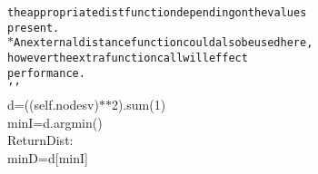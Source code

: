 {{\begin{tabbing}
{\texttt{\hspace{84pt}the\hspace{6pt}appropriate\hspace{6pt}dist\hspace{6pt}function\hspace{6pt}depending\hspace{6pt}on\hspace{6pt}the\hspace{6pt}values}}\\
{\texttt{\hspace{84pt}present.}}\\
{\texttt{\hspace{72pt}$\ast$\hspace{6pt}An\hspace{6pt}external\hspace{6pt}distance\hspace{6pt}function\hspace{6pt}could\hspace{6pt}also\hspace{6pt}be\hspace{6pt}used\hspace{6pt}here,}}\\
{\texttt{\hspace{84pt}however\hspace{6pt}the\hspace{6pt}extra\hspace{6pt}function\hspace{6pt}call\hspace{6pt}will\hspace{6pt}effect}}\\
{\texttt{\hspace{84pt}performance.}}\\
{\texttt{\hspace{48pt}{'}}}{\texttt{{'}{'}}}\\
\hspace{48pt}d\hspace{6pt}=\hspace{6pt}((self.nodes\dash{}v)$\ast$$\ast$2).sum(1)\\
\hspace{48pt}minI\hspace{6pt}=\hspace{6pt}d.argmin()\\
\hspace{6pt}ReturnDist:\\
\hspace{72pt}minD\hspace{6pt}=\hspace{6pt}d{[}minI{]}\\
$$
\end{tabbing}}}
